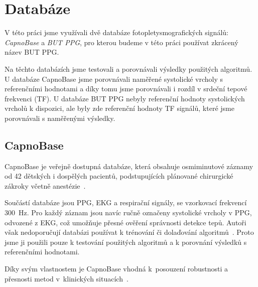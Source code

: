 \raggedbottom
\chapter{Databáze}
\label{chap:databaze}

V této práci jsme využívali dvě databáze fotopletysmografických signálů: \textit{CapnoBase} a \textit{\acl{BUT PPG}}, pro kterou budeme v této práci používat zkrácený název \acs{BUT PPG}.

Na těchto databázích jsme testovali a porovnávali výsledky použitých algoritmů.
U databáze CapnoBase jsme porovnávali naměřené systolické vrcholy s referenčními hodnotami a díky tomu jsme porovnávali i rozdíl v srdeční tepové frekvenci (\acs{TF}).
U databáze \acs{BUT PPG} nebyly referenční hodnoty systolických vrcholů k dispozici, ale byly zde referenční hodnoty \acs{TF} signálů, které jsme porovnávali s naměřenými výsledky.

\section{CapnoBase}
\label{sec:capnobase}
CapnoBase je veřejně dostupná databáze, která obsahuje osmiminutové záznamy od 42 dětských i dospělých pacientů, podstupujících plánované chirurgické zákroky včetně anestézie~\cite{CapnoBase}.

Součástí databáze jsou \acs{PPG}, \acs{EKG} a respirační signály, se vzorkovací frekvencí 300~Hz.
Pro každý záznam jsou navíc ručně označeny systolické vrcholy v \acs{PPG}, odvozené z \acs{EKG}, což umožňuje přesné ověření správnosti detekce tepů.
Autoři však nedoporučují databázi používat k trénování či dolaďování algoritmů~\cite{CapnoBase}.
Proto jsme ji použili pouze k testování použitých algoritmů a k porovnání výsledků s referenčními hodnotami.

Díky svým vlastnostem je CapnoBase vhodná k~posouzení robustnosti a přesnosti metod v~klinických situacích~\cite{Karlen2013,Charlton2022}.

